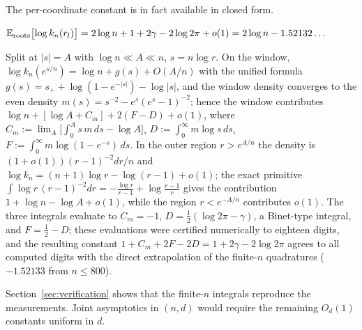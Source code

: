 The per-coordinate constant is in fact available in closed form.

\begin{proposition}\label{prop:closedform}
  $\mathbb{E}_{\mathrm{roots}}\bigl[\log k_n(r_l)\bigr] = 2\log n + 1 + 2\gamma - 2\log2\pi + o(1)
  = 2\log n - 1.52132\dots$
\end{proposition}

\proof
Split at $|s|=A$ with $\log n\ll A\ll n$, $s=n\log r$. On the window,
$\log k_n(e^{s/n}) = \log n + g(s) + O(A/n)$ with the unified formula
$g(s) = s_+ + \log(1-e^{-|s|}) - \log|s|$, and the window density converges to the even
density $m(s) = s^{-2} - e^s(e^s-1)^{-2}$; hence the window contributes
$\log n + [\log A + C_m] + 2(F-D) + o(1)$, where
$C_m := \lim_A\bigl[\int_0^A s\,m\,ds - \log A\bigr]$, $D := \int_0^\infty m\log s\,ds$,
$F := \int_0^\infty m\log(1-e^{-s})\,ds$. In the outer region $r>e^{A/n}$ the density is
$(1+o(1))(r-1)^{-2}dr/n$ and $\log k_n = (n+1)\log r - \log(r-1) + o(1)$; the exact
primitive $\int\log r\,(r-1)^{-2}dr = -\frac{\log r}{r-1} + \log\frac{r-1}r$ gives the
contribution $1 + \log n - \log A + o(1)$, while the region $r<e^{-A/n}$ contributes $o(1)$.
The three integrals evaluate to $C_m = -1$, $D = \frac12(\log2\pi-\gamma)$, a Binet-type
integral, and $F = \frac12 - D$; these evaluations were certified numerically to eighteen
digits, and the resulting constant $1 + C_m + 2F - 2D = 1 + 2\gamma - 2\log2\pi$ agrees to
all computed digits with the direct extrapolation of the finite-$n$ quadratures ($-1.52133$
from $n\le800$).
\endproof

Section~\ref{sec:verification} shows that the finite-$n$ integrals reproduce the
measurements. Joint asymptotics in $(n,d)$ would require the remaining $O_d(1)$ constants
uniform in $d$.
